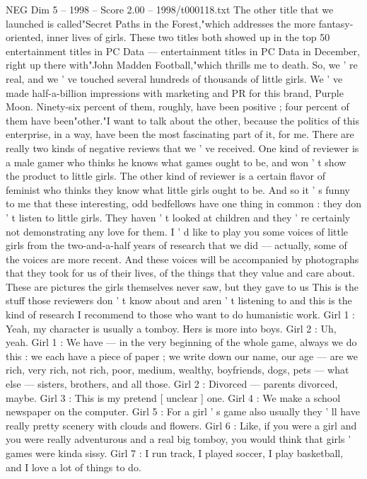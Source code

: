 \begin{textsample}{NEG Dim 5 – 1998 – Score 2.00 – 1998/t000118.txt}
The other title that we launched is called"Secret Paths in the Forest,"which addresses the more fantasy-oriented, inner lives of girls.
These two titles both showed up in the top 50 entertainment titles in PC Data — entertainment titles in PC Data in December, right up there with"John Madden Football,"which thrills me to death.
So, we ' re real, and we ' ve touched several hundreds of thousands of little girls.
We ' ve made half-a-billion impressions with marketing and PR for this brand, Purple Moon.
Ninety-six percent of them, roughly, have been positive ; four percent of them have been"other."I want to talk about the other, because the politics of this enterprise, in a way, have been the most fascinating part of it, for me.
There are really two kinds of negative reviews that we ' ve received.
One kind of reviewer is a male gamer who thinks he knows what games ought to be, and won ' t show the product to little girls.
The other kind of reviewer is a certain flavor of feminist who thinks they know what little girls ought to be.
And so it ' s funny to me that these interesting, odd bedfellows have one thing in common : they don ' t listen to little girls.
They haven ' t looked at children and they ' re certainly not demonstrating any love for them.
I ' d like to play you some voices of little girls from the two-and-a-half years of research that we did — actually, some of the voices are more recent.
And these voices will be accompanied by photographs that they took for us of their lives, of the things that they value and care about.
These are pictures the girls themselves never saw, but they gave to us This is the stuff those reviewers don ' t know about and aren ' t listening to and this is the kind of research I recommend to those who want to do humanistic work.
Girl 1 : Yeah, my character is usually a tomboy.
Hers is more into boys.
Girl 2 : Uh, yeah.
Girl 1 : We have — in the very beginning of the whole game, always we do this : we each have a piece of paper ; we write down our name, our age — are we rich, very rich, not rich, poor, medium, wealthy, boyfriends, dogs, pets — what else — sisters, brothers, and all those.
Girl 2 : Divorced — parents divorced, maybe.
Girl 3 : This is my pretend [ unclear ] one.
Girl 4 : We make a school newspaper on the computer.
Girl 5 : For a girl ' s game also usually they ' ll have really pretty scenery with clouds and flowers.
Girl 6 : Like, if you were a girl and you were really adventurous and a real big tomboy, you would think that girls ' games were kinda sissy.
Girl 7 : I run track, I played soccer, I play basketball, and I love a lot of things to do.

\end{textsample}
